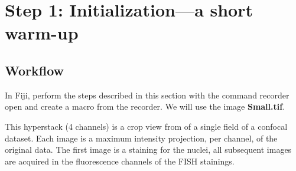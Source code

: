 \section{Step 1: Initialization---a short warm-up}

\subsection{Workflow}

In Fiji, perform the steps described in this section with the command recorder open and create a macro from the recorder.
We will use the image \textbf{Small.tif}.

This hyperstack (4 channels) is a crop view from of a single field of a confocal dataset.
Each image is a maximum intensity projection, per channel, of the original data. 
The first image is a staining for the nuclei, all subsequent images are acquired in the fluorescence channels of the FISH stainings.